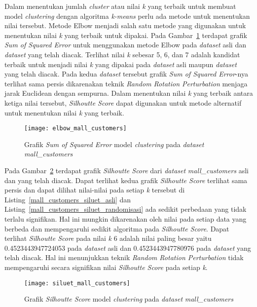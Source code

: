 Dalam menentukan jumlah \textit{cluster} atau nilai \textit{k} yang terbaik untuk membuat model \textit{clustering} dengan algoritma \textit{k-means} perlu ada metode untuk menentukan nilai tersebut. Metode Elbow menjadi salah satu metode yang digunakan untuk  menentukan nilai \textit{k} yang terbaik untuk dipakai. Pada Gambar~\ref{fig:elbow_mall_customers} terdapat grafik \textit{Sum of Squared Error} untuk menggunakan metode Elbow pada \textit{dataset} asli dan \textit{dataset} yang telah diacak. Terlihat nilai \textit{k} sebesar 5, 6, dan 7 adalah kandidat terbaik untuk menjadi nilai \textit{k} yang dipakai pada \textit{dataset} asli maupun \textit{dataset} yang telah diacak. Pada kedua \textit{dataset} tersebut grafik \textit{Sum of Squared Error}-nya terlihat sama persis dikarenakan teknik \textit{Random Rotation Perturbation} menjaga jarak Euclidean dengan sempurna. Dalam menentukan nilai \textit{k} yang terbaik antara ketiga nilai tersebut, \textit{Silhoutte Score} dapat digunakan untuk metode alternatif untuk menentukan nilai \textit{k} yang terbaik.

\begin{figure}
	\centering
	\texttt{[image: elbow\_mall\_customers]}
	\caption{Grafik \textit{Sum of Squared Error} model \textit{clustering} pada \textit{dataset} \textit{mall\_customers}}
	\label{fig:elbow_mall_customers}
\end{figure}

Pada Gambar~\ref{fig:siluet_mall_customers} terdapat grafik \textit{Silhoutte Score} dari \textit{dataset} \textit{mall\_customers} asli dan yang telah diacak. Dapat terlihat kedua grafik \textit{Silhoutte Score} terlihat sama persis dan dapat dilihat nilai-nilai pada setiap \textit{k} tersebut di Listing~\ref{mall_customers_siluet_asli} dan Listing~\ref{mall_customers_siluet_randomisasi} ada sedikit perbedaan yang tidak terlalu signifikan. Hal ini mungkin dikarenakan oleh nilai pada setiap data yang berbeda dan mempengaruhi sedikit algoritma pada \textit{Silhoutte Score}. Dapat terlihat \textit{Silhoutte Score} pada nilai \textit{k} 6 adalah nilai paling besar yaitu 0.4523443947724053 pada \textit{dataset} asli dan 0.4523443947780976 pada \textit{dataset} yang telah diacak. Hal ini menunjukkan teknik \textit{Random Rotation Perturbation} tidak mempengaruhi secara signifikan nilai \textit{Silhoutte Score} pada setiap \textit{k}.

\begin{figure}
	\centering
	\texttt{[image: siluet\_mall\_customers]}
	\caption{Grafik \textit{Silhoutte Score} model \textit{clustering} pada \textit{dataset} \textit{mall\_customers}}
	\label{fig:siluet_mall_customers}
\end{figure}
	
